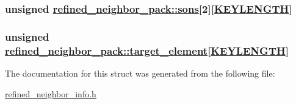\hypertarget{structrefined__neighbor__pack_o3}{
\subsubsection[sons]{\setlength{\rightskip}{0pt plus 5cm}unsigned \hyperlink{structrefined__neighbor__pack_o3}{refined\_\-neighbor\_\-pack::sons}\mbox{[}2\mbox{]}\mbox{[}\hyperlink{constant_8h_a10}{KEYLENGTH}\mbox{]}}}
\label{structrefined__neighbor__pack_o3}


\hypertarget{structrefined__neighbor__pack_o1}{
\subsubsection[target\_\-element]{\setlength{\rightskip}{0pt plus 5cm}unsigned \hyperlink{structrefined__neighbor__pack_o1}{refined\_\-neighbor\_\-pack::target\_\-element}\mbox{[}\hyperlink{constant_8h_a10}{KEYLENGTH}\mbox{]}}}
\label{structrefined__neighbor__pack_o1}




The documentation for this struct was generated from the following file:\begin{CompactItemize}
\item 
\hyperlink{refined__neighbor__info_8h}{refined\_\-neighbor\_\-info.h}\end{CompactItemize}
